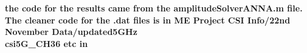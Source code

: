 \textbf{the code for the results came from the amplitudeSolverANNA.m file. The cleaner code for the .dat files is in ME Project CSI Info/22nd November Data/updated5GHz \\ csi5G\_CH36 etc in }